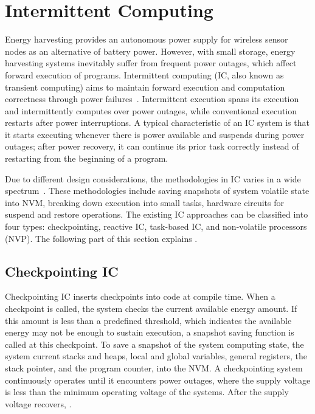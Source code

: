 

\section{Intermittent Computing} \label{sec:ips}

Energy harvesting provides an autonomous power supply for wireless sensor nodes as an alternative of battery power. However, with small storage, energy harvesting systems inevitably suffer from frequent power outages, which affect forward execution of programs. Intermittent computing (IC, also known as transient computing) aims to maintain forward execution and computation correctness through power failures~\cite{ransford2012mementos}. Intermittent execution spans its execution and intermittently computes over power outages, while conventional execution restarts after power interruptions. A typical characteristic of an IC system is that it starts executing whenever there is power available and suspends during power outages; after power recovery, it can continue its prior task correctly instead of restarting from the beginning of a program. 

Due to different design considerations, the methodologies in IC varies in a wide spectrum~\cite{sliper2018enabling}. 
These methodologies include saving snapshots of system volatile state into NVM, breaking down execution into small tasks, hardware circuits for suspend and restore operations. 
The existing IC approaches can be classified into four types: checkpointing, reactive IC, task-based IC, and non-volatile processors (NVP). 
The following part of this section explains .

\subsection{Checkpointing IC}

Checkpointing IC inserts checkpoints into code at compile time. When a checkpoint is called, the system checks the current available energy amount. If this amount is less than a predefined threshold, which indicates the available energy may not be enough to sustain execution, a snapshot saving function is called at this checkpoint. To save a snapshot of the system computing state, the system  current stacks and heaps, local and global variables, general registers, the stack pointer, and the program counter, into the NVM. A checkpointing system continuously operates until it encounters power outages, where the supply voltage is less than the minimum operating voltage of the systems. After the supply voltage recovers, . 

